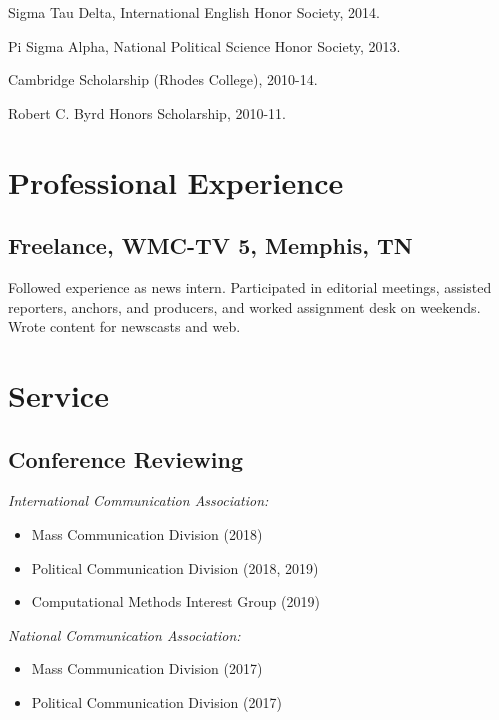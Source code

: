 \documentclass[letterpaper,MMMyyyy,nonstopmode]{simplecv}
\def\tightlist{} %
\begin{document}
\begin{Body}
Sigma Tau Delta, International English Honor Society, 2014.

Pi Sigma Alpha, National Political Science Honor Society, 2013.

Cambridge Scholarship (Rhodes College), 2010-14.

Robert C. Byrd Honors Scholarship, 2010-11.

\hypertarget{professional-experience}{%
\section{Professional Experience}\label{professional-experience}}

\hypertarget{freelance-wmc-tv-5-memphis-tn}{%
\subsection{\texorpdfstring{Freelance, WMC-TV 5, \normalfont Memphis,
TN}{Freelance, WMC-TV 5, Memphis, TN}}\label{freelance-wmc-tv-5-memphis-tn}}

Followed experience as news intern. Participated in editorial meetings,
assisted reporters, anchors, and producers, and worked assignment desk
on weekends. Wrote content for newscasts and web.

\hypertarget{service}{%
\section{Service}\label{service}}

\hypertarget{conference-reviewing}{%
\subsection{Conference Reviewing}\label{conference-reviewing}}

\emph{International Communication Association:}

\begin{itemize}
\tightlist
\item
  Mass Communication Division (2018)
\item
  Political Communication Division (2018, 2019)
\item
  Computational Methods Interest Group (2019)
\end{itemize}

\emph{National Communication Association:}

\begin{itemize}
\tightlist
\item
  Mass Communication Division (2017)
\item
  Political Communication Division (2017)
\end{itemize}


\end{Body}
\end{document}
